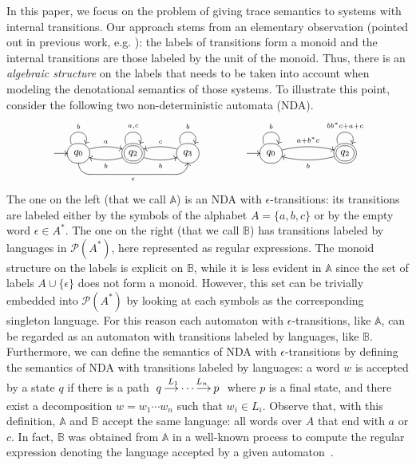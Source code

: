 \documentclass[oribibl,envcountsame,envcountsect,runningheads]{llncs}
\newcommand{\Pow}{\mathcal{P}}
\newcommand{\state}[1]{*++[F-:<10pt>]{#1}}
\newcommand{\fstate}[1]{*++[F=:<10pt>]{#1}}
\renewcommand{\>}{\rangle}
\begin{document}
In this paper, we focus on the problem of giving trace semantics to systems with internal transitions.
Our approach stems from an elementary observation (pointed out in previous work, e.g. \cite{Sobocinski2012}): the labels of transitions form a monoid and the internal transitions are those labeled by the unit of the monoid. Thus, there is an \emph{algebraic structure} on the labels that needs to be taken into account when modeling the denotational semantics of those systems.
To illustrate this point, consider the following two non-deterministic automata (NDA).
$$\small
\xymatrix@C=.4cm {\ar[r]&\state{q_0}\ar@(ul,ur)^{b}\ar@/^/[rr]^a&&\fstate{q_2}\ar@/^/[ll]^b\ar@/_/[rr]_{b}\ar@(ul,ur)^{a,c}&& \state{q_3}\ar@(ul,ur)^{b}\ar@/_/[ll]_{c}\ar@{<-} `d[l] `[llll]^\epsilon [llll]} 
\qquad\qquad
\xymatrix@C=.4cm {\ar[r]&\state{q_0}\ar@/^/[rrr]^{a+b^*c}\ar@(ul,ur)^{b}&&
&\fstate{q_2}\ar@/^/[lll]^{b}\ar@(ul,ur)^{bb^*c+a+c} }
$$
The one on the left (that we call $\mathbb{A}$) is an NDA with $\epsilon$-transitions: its transitions are labeled either by the symbols of the alphabet $A=\{a,b,c\}$ or by the empty word $\epsilon\in A^*$. The one on the right (that we call $\mathbb{B}$) has transitions labeled by languages in $\Pow(A^*)$, here represented as regular expressions.
The monoid structure on the labels is explicit on $\mathbb{B}$, while it is less evident in $\mathbb{A}$ since the set of labels $A\cup \{\epsilon \}$ does not form a monoid. However, this set can be trivially embedded into $\Pow(A^*)$ by looking at each symbols as the corresponding singleton language. For this reason each automaton with $\epsilon$-transitions, like $\mathbb{A}$, can be regarded as an automaton with transitions labeled by languages, like $\mathbb{B}$. Furthermore, we can define the semantics of NDA with $\epsilon$-transitions by defining the semantics of NDA with transitions labeled by languages: a word $w$ is accepted by a state $q$ if there is a path $\xymatrix@C=.4cm {q\ar[r]^{L_1} & \cdots  \ar[r]^{L_n} & p}$ where $p$ is a final state, and there exist a decomposition $w=w_1\cdots w_n$ such that $w_i \in L_i$.
Observe that, with this definition, $\mathbb{A}$ and $\mathbb{B}$ accept the same language: all words over $A$ that end with $a$ or $c$. In fact, $\mathbb{B}$ was obtained from $\mathbb{A}$ in a well-known process to compute the regular expression denoting the language accepted by a given automaton~\cite{Hopcroft}.
\end{document}
